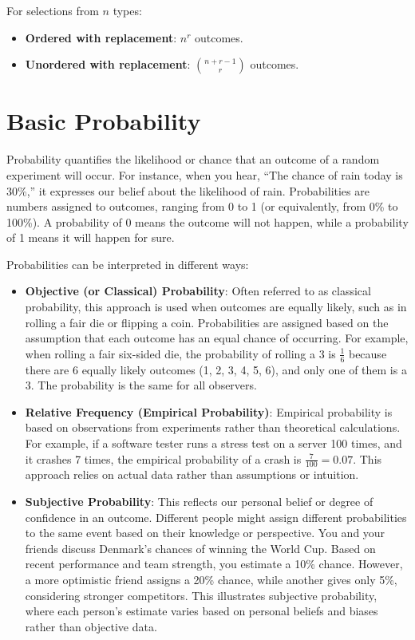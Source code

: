 \begin{proposition}
For selections from $n$ types:
\begin{itemize}
    \item \textbf{Ordered with replacement}: $n^r$ outcomes.
    \item \textbf{Unordered with replacement}: $\displaystyle \binom{n+r-1}{r}$ outcomes. %
\end{itemize}
\end{proposition}

\section{Basic Probability}
Probability quantifies the likelihood or chance that an outcome of a random experiment will occur. For instance, when you hear, “The chance of rain today is 30\%,” it expresses our belief about the likelihood of rain. Probabilities are numbers assigned to outcomes, ranging from 0 to 1 (or equivalently, from 0\% to 100\%). A probability of 0 means the outcome will not happen, while a probability of 1 means it will happen for sure.

Probabilities can be interpreted in different ways:

\begin{itemize}
    \item \textbf{Objective (or Classical) Probability}: Often referred to as classical probability, this approach is used when outcomes are equally likely, such as in rolling a fair die or flipping a coin. Probabilities are assigned based on the assumption that each outcome has an equal chance of occurring. For example, when rolling a fair six-sided die, the probability of rolling a 3 is \( \frac{1}{6} \) because there are 6 equally likely outcomes (1, 2, 3, 4, 5, 6), and only one of them is a 3. The probability is the same for all observers.
        
    \item \textbf{Relative Frequency (Empirical Probability)}: Empirical probability is based on observations from experiments rather than theoretical calculations. For example, if a software tester runs a stress test on a server 100 times, and it crashes 7 times, the empirical probability of a crash is \( \frac{7}{100} = 0.07 \). This approach relies on actual data rather than assumptions or intuition.
        
    \item \textbf{Subjective Probability}: This reflects our personal belief or degree of confidence in an outcome. Different people might assign different probabilities to the same event based on their knowledge or perspective. You and your friends discuss Denmark’s chances of winning the World Cup. Based on recent performance and team strength, you estimate a 10\% chance. However, a more optimistic friend assigns a 20\% chance, while another gives only 5\%, considering stronger competitors. This illustrates subjective probability, where each person's estimate varies based on personal beliefs and biases rather than objective data.
    

\end{itemize}

